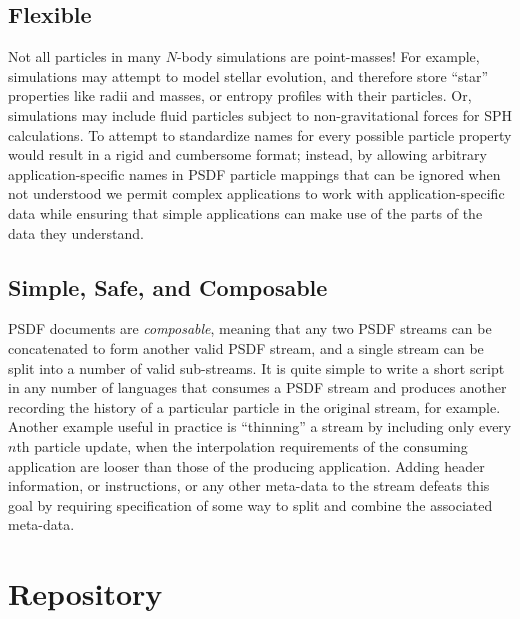 \documentclass[5p,authoryear]{elsarticle}
\begin{document}
\subsection{Flexible}

Not all particles in many $N$-body simulations are point-masses!  For
example, simulations may attempt to model stellar evolution, and
therefore store ``star'' properties like radii and masses, or entropy
profiles with their particles.  Or, simulations may include fluid
particles subject to non-gravitational forces for SPH calculations.
To attempt to standardize names for every possible particle property
would result in a rigid and cumbersome format; instead, by allowing
arbitrary application-specific names in PSDF particle mappings that
can be ignored when not understood we permit complex applications to
work with application-specific data while ensuring that simple
applications can make use of the parts of the data they understand.

\subsection{Simple, Safe, and Composable}

PSDF documents are \emph{composable}, meaning that any two PSDF
streams can be concatenated to form another valid PSDF stream, and a
single stream can be split into a number of valid sub-streams.  It is
quite simple to write a short script in any number of languages that
consumes a PSDF stream and produces another recording the history of a
particular particle in the original stream, for example.  Another
example useful in practice is ``thinning'' a stream by including only
every $n$th particle update, when the interpolation requirements of
the consuming application are looser than those of the producing
application.  Adding header information, or instructions, or any other
meta-data to the stream defeats this goal by requiring specification
of some way to split and combine the associated meta-data.

\section{Repository}
\label{sec:repository}
\end{document}
